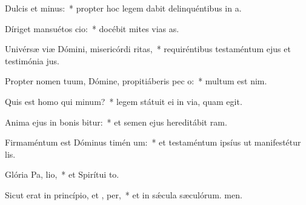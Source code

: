 \item Dulcis et  minus:~* propter hoc legem dabit delinquéntibus in a.
\item Díriget mansuétos  cio:~* docébit mites vias as.
\item Univérsæ viæ Dómini, misericórdi  ritas,~* requiréntibus testaméntum ejus et testimónia jus.
\item Propter nomen tuum, Dómine, propitiáberis pec o:~* multum est nim.
\item Quis est homo qui  minum?~* legem státuit ei in via, quam egit.
\item Anima ejus in bonis bitur:~* et semen ejus hereditábit ram.
\item Firmaméntum est Dóminus timén um:~* et testaméntum ipsíus ut manifestétur lis.
\item Glória Pa,  lio,~* et Spirítui to.
\item Sicut erat in princípio, et ,  per,~* et in sǽcula sæculórum. men.
